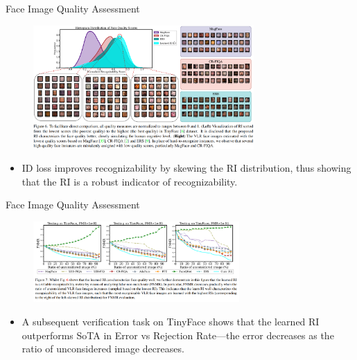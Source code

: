 \documentclass[aspectratio=169,xcolor=dvipsnames]{beamer}
\begin{document}

\begin{frame}{Face Image Quality Assessment}
    \begin{figure}
        \centering
        \includegraphics[width=0.75\textwidth]{imgs/08_Fig_6_AA.png}
        \label{fig:f6-aa}
    \end{figure}
    \begin{itemize}
        \item ID loss improves recognizability by skewing the RI distribution, thus showing that the RI is a robust indicator of recognizability.
    \end{itemize}
\end{frame}


\begin{frame}{Face Image Quality Assessment}
    \begin{figure}
        \centering
        \includegraphics[width=0.7\textwidth]{imgs/09_Fig_7_AA.png}
        \label{fig:f7-aa}
    \end{figure}
    \begin{itemize}
        \item A subsequent verification task on TinyFace shows that the learned RI outperforms SoTA in Error vs Rejection Rate---the error decreases as the ratio of unconsidered image decreases.
    \end{itemize}
\end{frame}
\end{document}

